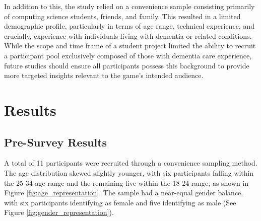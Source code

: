 \documentclass{l4proj}
\begin{document}
In addition to this, the study relied on a convenience sample consisting primarily of computing science students, friends, and family. This resulted in a limited demographic profile, particularly in terms of age range, technical experience, and crucially, experience with individuals living with dementia or related conditions. While the scope and time frame of a student project limited the ability to recruit a participant pool exclusively composed of those with dementia care experience, future studies should ensure all participants possess this background to provide more targeted insights relevant to the game's intended audience.

\section{Results}

\subsection{Pre-Survey Results}
A total of 11 participants were recruited through a convenience sampling method.  The age distribution skewed slightly younger, with six participants falling within the 25-34 age range and the remaining five within the 18-24 range, as shown in Figure \ref{fig:age_representation}. The sample had a near-equal gender balance, with six participants identifying as female and five identifying as male (See Figure \ref{fig:gender_representation}).
\end{document}
